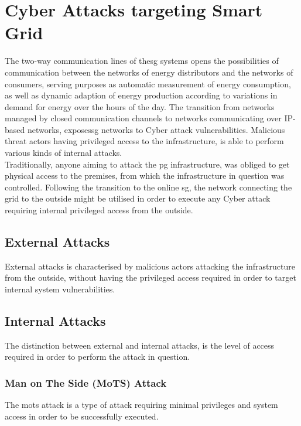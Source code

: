 \section{Cyber Attacks targeting Smart Grid}

The two-way communication lines of the\acrlong{sg} systems opens the possibilities of communication between the networks of energy distributors and the networks of consumers, serving purposes as automatic measurement of energy consumption, as well as dynamic adaption of energy production according to variations in demand for energy over the hours of the day.
The transition from networks managed by closed communication channels to networks communicating over IP-based networks, exposes\acrlong{sg} networks to Cyber attack vulnerabilities.
Malicious threat actors having privileged access to the infrastructure, is able to perform various kinds of internal attacks.\\

Traditionally, anyone aiming to attack the \acrlong{pg} infrastructure, was obliged to get physical access to the premises, from which the infrastructure in question was controlled. Following the transition to the online \acrshort{sg}, the network connecting the grid to the outside might be utilised in order to execute any Cyber attack requiring internal privileged access from the outside.


\subsection{External Attacks}
External attacks is characterised by malicious actors attacking the infrastructure from the outside, without having the privileged access required in order to target internal system vulnerabilities.


\subsection{Internal Attacks}
The distinction between external and internal attacks, is the level of access required in order to perform the attack in question.

\subsubsection{Man on The Side (MoTS) Attack}
The \acrfull{mots} attack is a type of attack requiring minimal privileges and system access in order to be successfully executed.




